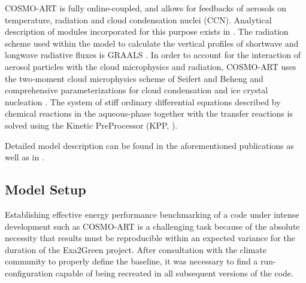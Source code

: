 COSMO-ART  is  fully  online-coupled,  and  allows  for  feedbacks  of
aerosols  on  temperature,  radiation  and cloud  condensation  nuclei
(CCN).   Analytical  description  of  modules  incorporated  for  this
purpose  exists in  \citep{Vogel-2009,  Bangert-2011}.  The  radiation
scheme used  within the  model to calculate  the vertical  profiles of
shortwave and longwave radiative fluxes is GRAALS \citep{Ritter-1992}.
In order to account for  the interaction of aerosol particles with the
cloud microphysics and radiation,  COSMO-ART uses the two-moment cloud
microphysics  scheme of  Seifert and  Beheng  \citep{Seifert-2006} and
comprehensive parameterizations for cloud condensation and ice crystal
nucleation  \citep{Bangert-2011, Bangert-2012}.   The system  of stiff
ordinary differential equations described by chemical reactions in the
aqueous-phase together with the transfer reactions is solved using the
Kinetic PreProcessor (KPP, \citealp{Damian-2002}).

Detailed  model  description  can   be  found  in  the  aforementioned
publications  as   well  as  in   \citep{Stanelle-2010,  Bangert-2012,
  Knote-2011, Knote-2013}.

\subsection{Model Setup}
\label{subsec:1.2}
Establishing effective energy performance benchmarking of a code under
intense development such as COSMO-ART is a challenging task because of
the  absolute necessity that  results must  be reproducible  within an
expected  variance for the  duration of  the Exa2Green  project. After
consultation  with  the  climate  community  to  properly  define  the
baseline,  it was  necessary to  find a  run-configuration  capable of
being recreated in all subsequent versions of the code.

